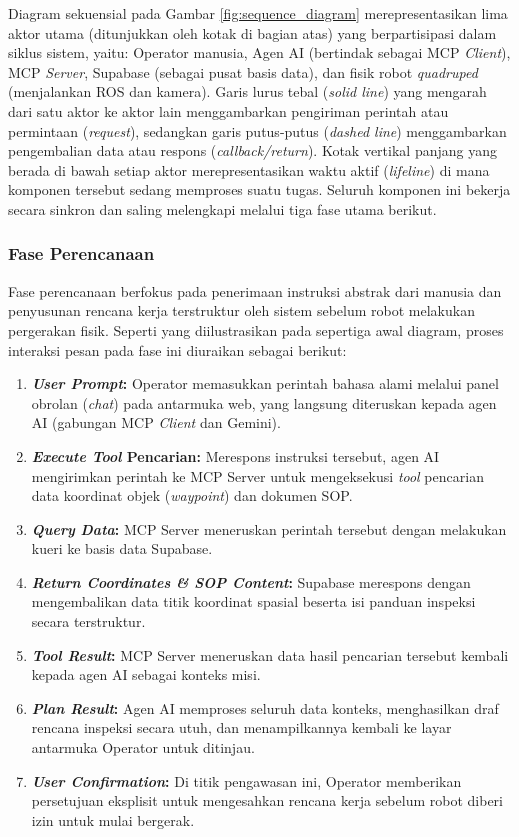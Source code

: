Diagram sekuensial pada Gambar \ref{fig:sequence_diagram} merepresentasikan lima aktor utama (ditunjukkan oleh kotak di bagian atas) yang berpartisipasi dalam siklus sistem, yaitu: Operator manusia, Agen AI (bertindak sebagai MCP \textit{Client}), MCP \textit{Server}, Supabase (sebagai pusat basis data), dan fisik robot \textit{quadruped} (menjalankan ROS dan kamera). Garis lurus tebal (\textit{solid line}) yang mengarah dari satu aktor ke aktor lain menggambarkan pengiriman perintah atau permintaan (\textit{request}), sedangkan garis putus-putus (\textit{dashed line}) menggambarkan pengembalian data atau respons (\textit{callback/return}). Kotak vertikal panjang yang berada di bawah setiap aktor merepresentasikan waktu aktif (\textit{lifeline}) di mana komponen tersebut sedang memproses suatu tugas. Seluruh komponen ini bekerja secara sinkron dan saling melengkapi melalui tiga fase utama berikut.

\subsubsection{Fase Perencanaan}

Fase perencanaan berfokus pada penerimaan instruksi abstrak dari manusia dan penyusunan rencana kerja terstruktur oleh sistem sebelum robot melakukan pergerakan fisik. Seperti yang diilustrasikan pada sepertiga awal diagram, proses interaksi pesan pada fase ini diuraikan sebagai berikut:

\begin{enumerate}
    \item \textbf{\textit{User Prompt}:} Operator memasukkan perintah bahasa alami melalui panel obrolan (\textit{chat}) pada antarmuka web, yang langsung diteruskan kepada agen AI (gabungan MCP \textit{Client} dan Gemini).
    \item \textbf{\textit{Execute Tool} Pencarian:} Merespons instruksi tersebut, agen AI mengirimkan perintah ke MCP Server untuk mengeksekusi \textit{tool} pencarian data koordinat objek (\textit{waypoint}) dan dokumen SOP.
    \item \textbf{\textit{Query Data}:} MCP Server meneruskan perintah tersebut dengan melakukan kueri ke basis data Supabase.
    \item \textbf{\textit{Return Coordinates \& SOP Content}:} Supabase merespons dengan mengembalikan data titik koordinat spasial beserta isi panduan inspeksi secara terstruktur.
    \item \textbf{\textit{Tool Result}:} MCP Server meneruskan data hasil pencarian tersebut kembali kepada agen AI sebagai konteks misi.
    \item \textbf{\textit{Plan Result}:} Agen AI memproses seluruh data konteks, menghasilkan draf rencana inspeksi secara utuh, dan menampilkannya kembali ke layar antarmuka Operator untuk ditinjau.
    \item \textbf{\textit{User Confirmation}:} Di titik pengawasan ini, Operator memberikan persetujuan eksplisit untuk mengesahkan rencana kerja sebelum robot diberi izin untuk mulai bergerak.
\end{enumerate}

